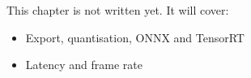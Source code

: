 \label{ch:ai6}
\begin{keyidea}
This chapter is not written yet. It will cover:
\begin{itemize}[nosep]
  \item Export, quantisation, ONNX and TensorRT
  \item Latency and frame rate
\end{itemize}
\end{keyidea}
